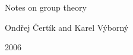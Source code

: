 \nopagenumbers

\centerline{\Large Notes on group theory}

\smallskip

\centerline{Ond\v rej \v Cert\'ik and Karel V\'yborn\'y}
\smallskip
\centerline{2006}

\bigskip




\vfill
\eject
